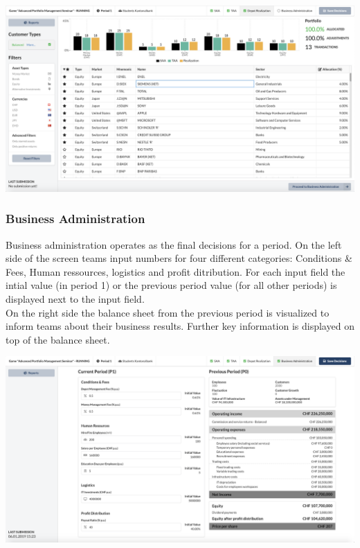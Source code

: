 \begin{center}
  \includegraphics[scale=0.2]{img/application-overview/teams/05_depot_realization.png}
\end{center}

\subsubsection{Business Administration}
Business administration operates as the final decisions for a period. On the left side of the screen teams input numbers for four different categories: Conditions \& Fees, Human ressources, logistics and profit ditribution. For each input field the intial value (in period 1) or the previous period value (for all other periods) is displayed next to the input field.\\

On the right side the balance sheet from the previous period is visualized to inform teams about their business results. Further key information is displayed on top of the balance sheet.
\begin{center}
  \includegraphics[scale=0.2]{img/application-overview/teams/06_business.png}
\end{center}
